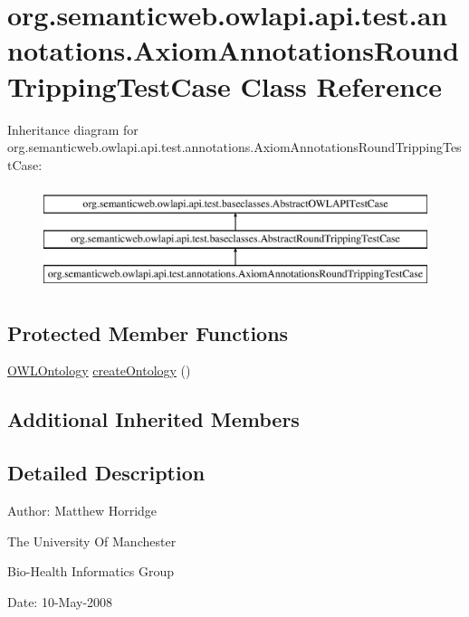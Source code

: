 \hypertarget{classorg_1_1semanticweb_1_1owlapi_1_1api_1_1test_1_1annotations_1_1_axiom_annotations_round_tripping_test_case}{\section{org.\-semanticweb.\-owlapi.\-api.\-test.\-annotations.\-Axiom\-Annotations\-Round\-Tripping\-Test\-Case Class Reference}
\label{classorg_1_1semanticweb_1_1owlapi_1_1api_1_1test_1_1annotations_1_1_axiom_annotations_round_tripping_test_case}
}
Inheritance diagram for org.\-semanticweb.\-owlapi.\-api.\-test.\-annotations.\-Axiom\-Annotations\-Round\-Tripping\-Test\-Case\-:\begin{figure}[H]
\begin{center}
\leavevmode
\includegraphics[height=3.000000cm]{classorg_1_1semanticweb_1_1owlapi_1_1api_1_1test_1_1annotations_1_1_axiom_annotations_round_tripping_test_case}
\end{center}
\end{figure}
\subsection*{Protected Member Functions}
\begin{DoxyCompactItemize}
\item 
\hyperlink{interfaceorg_1_1semanticweb_1_1owlapi_1_1model_1_1_o_w_l_ontology}{O\-W\-L\-Ontology} \hyperlink{classorg_1_1semanticweb_1_1owlapi_1_1api_1_1test_1_1annotations_1_1_axiom_annotations_round_tripping_test_case_a7d50bfa43b180a4024c22e1bdd14a618}{create\-Ontology} ()
\end{DoxyCompactItemize}
\subsection*{Additional Inherited Members}


\subsection{Detailed Description}
Author\-: Matthew Horridge\par
 The University Of Manchester\par
 Bio-\/\-Health Informatics Group\par
 Date\-: 10-\/\-May-\/2008\par
 \par
 

